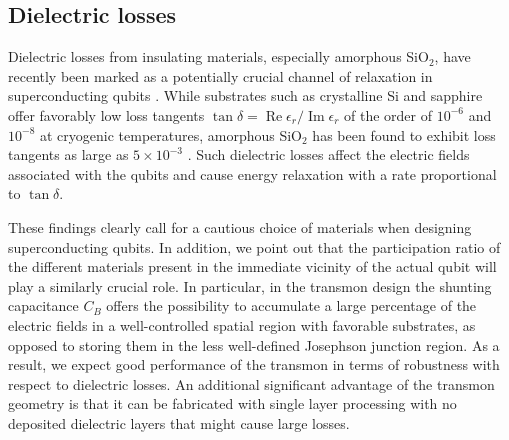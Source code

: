 \documentclass[twocolumn,amsmath,amssymb,floatfix,pra,showpacs,eqsecnum,footinbib,superscriptaddress]{revtex4}
\DeclareMathOperator{\rre}{Re}
\DeclareMathOperator{\iim}{Im}
\begin{document}
\subsection{Dielectric losses}
Dielectric losses from insulating materials, especially amorphous SiO$_2$, have recently been marked as a potentially crucial channel of relaxation in superconducting qubits \cite{martinis2}. While substrates such as crystalline Si and sapphire offer favorably low loss tangents $\tan \delta = \rre \epsilon_r /\iim \epsilon_r$ of the order of $10^{-6}$ and $10^{-8}$ at cryogenic temperatures, amorphous SiO$_2$ has been found to exhibit loss tangents as large as $5\times10^{-3}$ \cite{martinis2}. Such dielectric losses affect the electric fields associated with the qubits and cause energy relaxation with a rate proportional to $\tan \delta$.

These findings clearly call for a cautious choice of materials when designing superconducting qubits. In addition, we point out that the participation ratio of the different materials present in the immediate vicinity of the actual qubit will play a similarly crucial role. In particular, in the transmon design the shunting capacitance $C_B$ offers the possibility to accumulate a large percentage of the electric fields in a well-controlled spatial region with favorable substrates, as opposed to storing them in the less well-defined Josephson junction region. As a result, we expect good performance of the transmon in terms of robustness with respect to dielectric losses. An additional significant advantage of the transmon geometry is that it can be fabricated with single layer processing with no deposited dielectric layers that might cause large losses.
\end{document}
